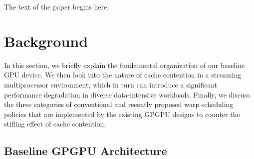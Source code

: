 \documentclass{sigplanconf}
\begin{document}
The text of the paper begins here.


\section{Background}
In this section, we briefly explain the fundamental organization of our baseline GPU device. We then look into the nature of cache contention in a streaming multiprocessor environment, which in turn can introduce a significant performance degradation in diverse data-intensive workloads. Finally, we discuss the three categories of conventional and recently proposed warp scheduling policies that are implemented by the existing GPGPU designs to counter the stifling effect of cache contention.

\subsection{Baseline GPGPU Architecture}
\end{document}
